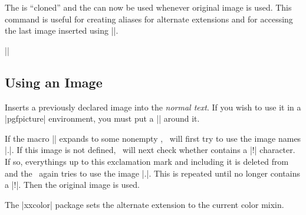 \begin{command}{\pgfaliasimage{}}
  The  is ``cloned'' and the  can now be used whenever original image is used. This
  command is useful for creating aliases for alternate extensions
  and for accessing the last image inserted using |\pgfimage|.

  \example ||
\end{command}


\subsection{Using an Image}

\begin{command}{\pgfuseimage{}}
  Inserts a previously declared image into the \emph{normal text}. If
  you wish to use it in a |{pgfpicture}| environment, you must put a
  |\pgftext| around it.

  If the macro |\pgfalternateextension| expands to some nonempty
  , \pgfname\ will first try to use the image
  names |.|. If this
  image is not defined, \pgfname\ will next check whether  contains a |!| character. If so, everythings up to this
  exclamation mark and including it is deleted from  and the \pgfname\ again tries to use the image |.|. This is repeated until
   no longer contains a |!|. Then the
  original image is used.

  The |xxcolor| package sets the alternate extension to the current
  color mixin. 

\begin{codeexample}[]
\begin{pgfpicture}

  \pgfpathrectangle{\pgfpoint{1cm}{1cm}}{\pgfpoint{1cm}{1cm}}
  \pgfpathrectangle{\pgfpoint{3cm}{1cm}}{\pgfpoint{1cm}{1cm}}
  \pgfpathrectangle{\pgfpoint{5cm}{1cm}}{\pgfpoint{1cm}{1cm}}
\end{pgfpicture}
\end{codeexample}


\end{command}

